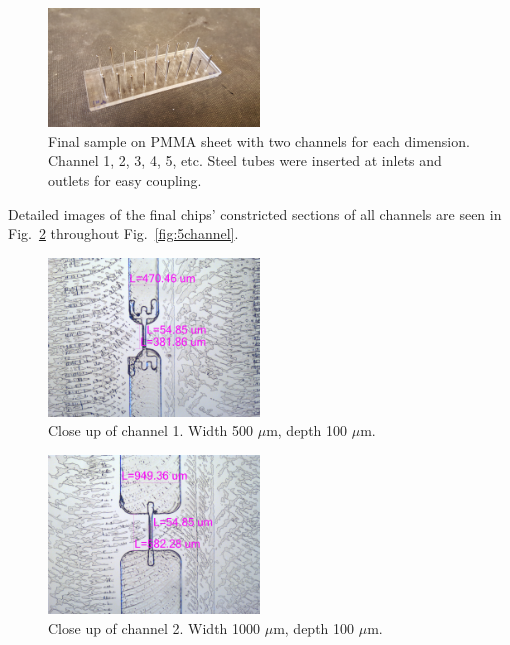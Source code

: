 \documentclass[journal, a4paper]{IEEEtran}
\begin{document}
\begin{figure}
	\begin{center}
\includegraphics[width=0.5\textwidth]{finalchip.png}
		\caption{\label{fig:chip} Final sample on PMMA sheet with two channels for each dimension. Channel 1, 2, 3, 4, 5, etc. Steel tubes were inserted at inlets and outlets for easy coupling.}
        	\end{center}
\end{figure}
 
Detailed images of the final chips' constricted sections of all channels are seen in Fig.~\ref{fig:1channel} throughout Fig.~\ref{fig:5channel}.

\begin{figure}
\begin{center}
\includegraphics[width=0.5\textwidth]{w500d100Dim.jpg}
		\caption{\label{fig:1channel} Close up of channel 1. Width 500 $\mu$m, depth 100 $\mu$m.}
        \end{center}
\end{figure}

\begin{figure}
\begin{center}
\includegraphics[width=0.5\textwidth]{w1000d100Dim.jpg}
		\caption{\label{fig:2channel} Close up of channel 2. Width 1000 $\mu$m, depth 100 $\mu$m.}
        \end{center}
\end{figure}
    
\end{document}
